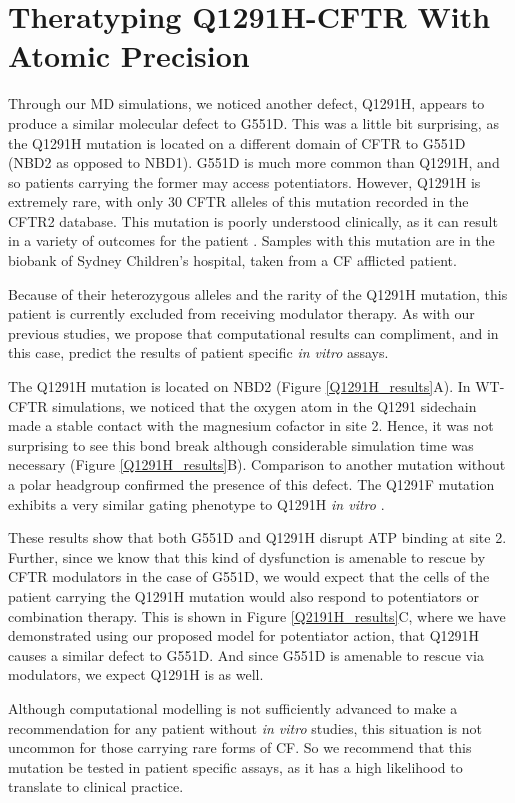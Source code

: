 \section{Theratyping Q1291H-CFTR With Atomic Precision}

Through our MD simulations, we noticed another defect, Q1291H, appears to produce a similar molecular defect to G551D. This was a little bit surprising, as the Q1291H mutation is located on a different domain of CFTR to G551D (NBD2 as opposed to NBD1). G551D is much more common than Q1291H, and so patients carrying the former may access potentiators. However, Q1291H is extremely rare, with only 30 CFTR alleles of this mutation recorded in the CFTR2 database. This mutation is poorly understood clinically, as it can result in a variety of outcomes for the patient \cite{cftr2}. Samples with this mutation are in the biobank of Sydney Children's hospital, taken from a CF afflicted patient. 

Because of their heterozygous alleles and the rarity of the Q1291H mutation, this patient is currently excluded from receiving modulator therapy. As with our previous studies, we propose that computational results can compliment, and in this case, predict the results of patient specific \textit{in vitro} assays. 

The Q1291H mutation is located on NBD2 (Figure \ref{Q1291H_results}A). In WT-CFTR simulations, we noticed that the oxygen atom in the  Q1291 sidechain made a stable contact with the magnesium cofactor in site 2. Hence, it was not surprising to see this bond break although considerable simulation time was necessary (Figure \ref{Q1291H_results}B). Comparison to another mutation without a polar headgroup confirmed the presence of this defect. The Q1291F mutation exhibits a very similar gating phenotype to Q1291H \textit{in vitro} \cite{dong2015}. 

These results show that both G551D and Q1291H disrupt ATP binding at site 2. Further, since we know that this kind of dysfunction is amenable to rescue by CFTR modulators in the case of G551D, we would expect that the cells of the patient carrying the Q1291H mutation would also respond to potentiators or combination therapy. This is shown in Figure \ref{Q2191H_results}C, where we have demonstrated using our proposed model for potentiator action, that Q1291H causes a similar defect to G551D. And since G551D is amenable to rescue via modulators, we expect Q1291H is as well. 

Although computational modelling is not sufficiently advanced to make a recommendation for any patient without \textit{in vitro} studies, this situation is not uncommon for those carrying rare forms of CF. So we recommend that this mutation be tested in patient specific assays, as it has a high likelihood to translate to clinical practice. 

